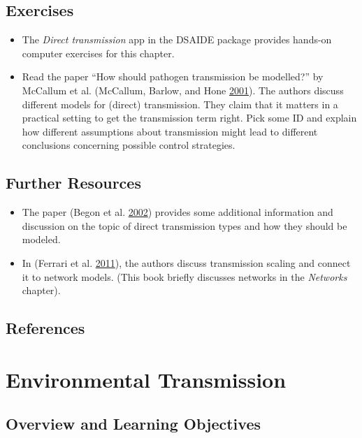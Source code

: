 \documentclass[]{article}
\providecommand{\tightlist}{%
  \setlength{\itemsep}{0pt}\setlength{\parskip}{0pt}}
\theoremstyle{definition}
\theoremstyle{definition}
\theoremstyle{definition}
\theoremstyle{remark}
\begin{document}
\subsection{Exercises}\label{exercises-5}

\begin{itemize}
\tightlist
\item
  The \emph{Direct transmission} app in the DSAIDE package provides
  hands-on computer exercises for this chapter.
\item
  Read the paper ``How should pathogen transmission be modelled?'' by
  McCallum et al. (McCallum, Barlow, and Hone
  \protect\hyperlink{ref-mccallum01}{2001}). The authors discuss
  different models for (direct) transmission. They claim that it matters
  in a practical setting to get the transmission term right. Pick some
  ID and explain how different assumptions about transmission might lead
  to different conclusions concerning possible control strategies.
\end{itemize}

\subsection{Further Resources}\label{further-resources-5}

\begin{itemize}
\tightlist
\item
  The paper (Begon et al. \protect\hyperlink{ref-begon02}{2002})
  provides some additional information and discussion on the topic of
  direct transmission types and how they should be modeled.
\item
  In (Ferrari et al. \protect\hyperlink{ref-ferrari11}{2011}), the
  authors discuss transmission scaling and connect it to network models.
  (This book briefly discusses networks in the \emph{Networks }
  chapter).
\end{itemize}

\subsection{References}\label{references-6}

\section{Environmental Transmission}\label{environmental-transmission-1}

\subsection{Overview and Learning
Objectives}\label{overview-and-learning-objectives-6}
\end{document}
